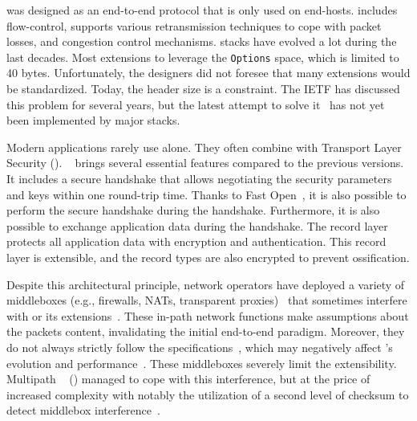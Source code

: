 
\tcp was designed as an end-to-end protocol that is only used on end-hosts.
\tcp includes flow-control, supports various retransmission techniques to cope
with packet losses, and congestion control mechanisms. \tcp stacks have evolved
a lot during the last decades. Most extensions to \tcp leverage the \tcp
\texttt{Options} space, which is limited to 40 bytes. Unfortunately, the \tcp
designers did not foresee that many \tcp extensions would be standardized.
Today, the \tcp header size is a constraint. The IETF has discussed this
problem for several years, but the latest attempt to solve
it~\cite{draft-ietf-tcpm-tcp-edo-10} has not yet been implemented by major
\tcp stacks.

Modern applications rarely use \tcp alone. They often combine \tcp with Transport Layer Security (\tls). ~\cite{rfc8446} brings several essential features compared to the previous versions. It includes a secure handshake that allows negotiating the security parameters and keys within one round-trip time. Thanks to \tcp Fast Open~\cite{radhakrishnan2011tcp}, it is also possible to perform the secure handshake during the \tcp handshake. Furthermore, it is also possible to exchange application data during the handshake. The  record layer protects all application data with encryption and authentication. This record layer is extensible, and the \tls record types are also encrypted to prevent ossification.

Despite this architectural principle, network operators have deployed a variety
of middleboxes (e.g., firewalls, NATs, transparent proxies)~\cite{mCloud} that
sometimes interfere with \tcp or its extensions~\cite{medina2004measuring,
honda2011still, edeline2019bottom}. These in-path network functions make
assumptions about the \tcp packets content, invalidating the initial \tcp
end-to-end paradigm. Moreover, they do not always strictly follow the
\tcp specifications~\cite{honda2011still, hesmans2013tcp}, which may negatively
affect \tcp's evolution and performance~\cite{edeline2020evaluating}. These
middleboxes severely limit the \tcp extensibility. Multipath \tcp~\cite{rfc8684,raiciu2012hard} (\mptcp) managed to cope with this interference, but at the price of increased complexity with notably the utilization of a second level of checksum to detect middlebox interference~\cite{raiciu2012hard,hesmans2013tcp}.

